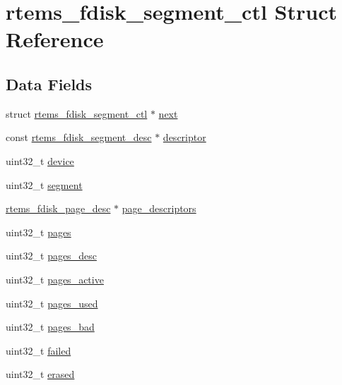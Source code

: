 \hypertarget{structrtems__fdisk__segment__ctl}{}\section{rtems\+\_\+fdisk\+\_\+segment\+\_\+ctl Struct Reference}
\label{structrtems__fdisk__segment__ctl}
\subsection*{Data Fields}
\begin{DoxyCompactItemize}
\item 
struct \mbox{\hyperlink{structrtems__fdisk__segment__ctl}{rtems\+\_\+fdisk\+\_\+segment\+\_\+ctl}} $\ast$ \mbox{\hyperlink{structrtems__fdisk__segment__ctl_a522eb0283ef89f20625143595bb7b334}{next}}
\item 
const \mbox{\hyperlink{structrtems__fdisk__segment__desc}{rtems\+\_\+fdisk\+\_\+segment\+\_\+desc}} $\ast$ \mbox{\hyperlink{structrtems__fdisk__segment__ctl_a1e69098549ae87b9e4558d07816772ec}{descriptor}}
\item 
uint32\+\_\+t \mbox{\hyperlink{structrtems__fdisk__segment__ctl_a96da4ef7d90aecf77f0dddb2284a5649}{device}}
\item 
uint32\+\_\+t \mbox{\hyperlink{structrtems__fdisk__segment__ctl_a02c1c94b6a9227a8a1275740cadd99cd}{segment}}
\item 
\mbox{\hyperlink{structrtems__fdisk__page__desc}{rtems\+\_\+fdisk\+\_\+page\+\_\+desc}} $\ast$ \mbox{\hyperlink{structrtems__fdisk__segment__ctl_a584c00d3cb5ff60b49821efa741c73c8}{page\+\_\+descriptors}}
\item 
uint32\+\_\+t \mbox{\hyperlink{structrtems__fdisk__segment__ctl_a859e26b4f6303684875fec8b34740604}{pages}}
\item 
uint32\+\_\+t \mbox{\hyperlink{structrtems__fdisk__segment__ctl_a5771c8ee9f9beda6681fab478d9b0f35}{pages\+\_\+desc}}
\item 
uint32\+\_\+t \mbox{\hyperlink{structrtems__fdisk__segment__ctl_a0bc620e64596e0f6fcd41a94254b651f}{pages\+\_\+active}}
\item 
uint32\+\_\+t \mbox{\hyperlink{structrtems__fdisk__segment__ctl_ac29f798bc7d3fcdd02e9d70aa9a80364}{pages\+\_\+used}}
\item 
uint32\+\_\+t \mbox{\hyperlink{structrtems__fdisk__segment__ctl_a30357e2ee99292954f5f83e59970765d}{pages\+\_\+bad}}
\item 
uint32\+\_\+t \mbox{\hyperlink{structrtems__fdisk__segment__ctl_a66c4b76d4b78004d603aa05a14a9ac07}{failed}}
\item 
uint32\+\_\+t \mbox{\hyperlink{structrtems__fdisk__segment__ctl_a5b22866e2e133be895c98d47d9b19729}{erased}}
\end{DoxyCompactItemize}


